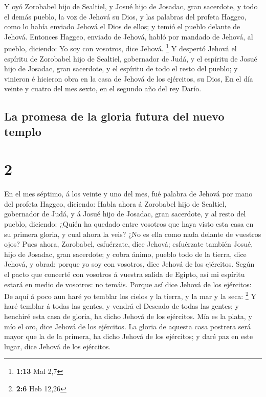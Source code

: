  Y oyó Zorobabel hijo de Sealtiel, y Josué hijo de
Josadac, gran sacerdote, y todo el demás pueblo, la voz de Jehová su
Dios, y las palabras del profeta Haggeo, como lo había enviado Jehová el
Dios de ellos; y temió el pueblo delante de Jehová. 
Entonces Haggeo, enviado de Jehová, habló por mandado de Jehová, al
pueblo, diciendo: Yo soy con vosotros, dice Jehová. \footnote{\textbf{1:13}
  Mal 2,7}  Y despertó Jehová el espíritu de Zorobabel
hijo de Sealtiel, gobernador de Judá, y el espíritu de Josué hijo de
Josadac, gran sacerdote, y el espíritu de todo el resto del pueblo; y
vinieron é hicieron obra en la casa de Jehová de los ejércitos, su Dios,
 En el día veinte y cuatro del mes sexto, en el segundo
año del rey Darío.

\hypertarget{la-promesa-de-la-gloria-futura-del-nuevo-templo}{%
\subsection{La promesa de la gloria futura del nuevo
templo}\label{la-promesa-de-la-gloria-futura-del-nuevo-templo}}

\hypertarget{section-1}{%
\section{2}\label{section-1}}

 En el mes séptimo, á los veinte y uno del mes, fué
palabra de Jehová por mano del profeta Haggeo, diciendo: 
Habla ahora á Zorobabel hijo de Sealtiel, gobernador de Judá, y á Josué
hijo de Josadac, gran sacerdote, y al resto del pueblo, diciendo:
 ¿Quién ha quedado entre vosotros que haya visto esta casa
en su primera gloria, y cual ahora la veis? ¿No es ella como nada
delante de vuestros ojos?  Pues ahora, Zorobabel,
esfuérzate, dice Jehová; esfuérzate también Josué, hijo de Josadac, gran
sacerdote; y cobra ánimo, pueblo todo de la tierra, dice Jehová, y
obrad: porque yo soy con vosotros, dice Jehová de los ejércitos.
 Según el pacto que concerté con vosotros á vuestra salida
de Egipto, así mi espíritu estará en medio de vosotros: no temáis.
 Porque así dice Jehová de los ejércitos: De aquí á poco
aun haré yo temblar los cielos y la tierra, y la mar y la seca:
\footnote{\textbf{2:6} Heb 12,26}  Y haré temblar á todas
las gentes, y vendrá el Deseado de todas las gentes; y henchiré esta
casa de gloria, ha dicho Jehová de los ejércitos.  Mía es
la plata, y mío el oro, dice Jehová de los ejércitos.  La
gloria de aquesta casa postrera será mayor que la de la primera, ha
dicho Jehová de los ejércitos; y daré paz en este lugar, dice Jehová de
los ejércitos.

